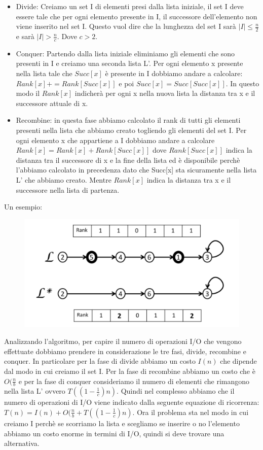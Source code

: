 \documentclass[14pt]{extreport}
\begin{document}
\begin{itemize}
    \item Divide: Creiamo un set I di elementi presi dalla lista iniziale, il set I deve essere tale che per ogni elemento presente in I, il successore dell'elemento non viene inserito nel set I. Questo vuol dire che la lunghezza del set I sarà $|I| \leq \frac{n}{2}$ e sarà $|I| > \frac{n}{c}$. Dove $c>2$.
    \item Conquer: Partendo dalla lista iniziale eliminiamo gli elementi che sono presenti in I e creiamo una seconda lista L'. Per ogni elemento x presente nella lista tale che $Succ[x]$ è presente in I dobbiamo andare a calcolare: $Rank[x] += Rank[Succ[x]]$ e poi $Succ[x] = Succ[Succ[x]]$. In questo modo il $Rank[x]$ indicherà per ogni x nella nuova lista la distanza tra x e il successore attuale di x.
    \item Recombine: in questa fase abbiamo calcolato il rank di tutti gli elementi presenti nella lista che abbiamo creato togliendo gli elementi del set I. Per ogni elemento x che appartiene a I dobbiamo andare a calcolare $Rank[x] = Rank[x] + Rank[Succ[x]]$ dove $ Rank[Succ[x]]$ indica la distanza tra il successore di x e la fine della lista ed è disponibile perchè l'abbiamo calcolato in precedenza dato che Succ[x] sta sicuramente nella lista L' che abbiamo creato.
    Mentre $Rank[x]$ indica la distanza tra x e il successore nella lista di partenza.
\end{itemize}

Un esempio:

\begin{figure}[h]
  \centering
  \includegraphics[width=0.8\linewidth]{ListRankingRec.png}
\end{figure}

Analizzando l'algoritmo, per capire il numero di operazioni I/O che vengono effettuate dobbiamo prendere in considerazione le tre fasi, divide, recombine e conquer.
In particolare per la fase di divide abbiamo un costo $I(n)$ che dipende dal modo in cui creiamo il set I. 
Per la fase di recombine abbiamo un costo che è $O(\frac{n}{b}$ e per la fase di conquer consideriamo il numero di elementi che rimangono nella lista L' ovvero $T((1-\frac{1}{c})n)$.
Quindi nel complesso abbiamo che il numero di operazioni di I/O viene indicato dalla seguente equazione di ricorrenza:
$T(n) = I(n) + O(\frac{n}{b} + T((1-\frac{1}{c})n)$.
Ora il problema sta nel modo in cui creiamo I perchè se scorriamo la lista e scegliamo se inserire o no l'elemento abbiamo un costo enorme in termini di I/O, quindi si deve trovare una alternativa.
\end{document}

